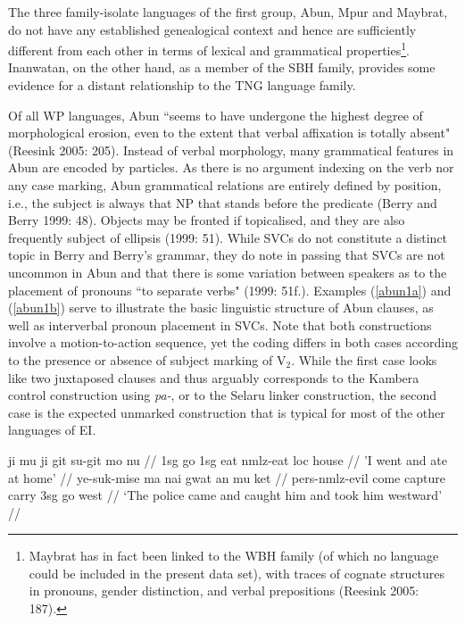 The three family-isolate languages of the first group, Abun, Mpur and Maybrat, do not have any established genealogical context and hence are sufficiently different from each other in terms of lexical and grammatical properties\footnote{Maybrat has in fact been linked to the \acs{WBH} family (of which no language could be included in the present data set), with traces of cognate structures in pronouns, gender distinction, and verbal prepositions (Reesink 2005: 187).}. Inanwatan, on the other hand, as a member of the SBH family, provides some evidence for a distant relationship to the TNG language family. 

Of all WP languages, Abun ``seems to have undergone the highest degree of morphological erosion, even to the extent that verbal affixation is totally absent" (Reesink 2005: 205). Instead of verbal morphology, many grammatical features in Abun are encoded by particles. As there is no argument indexing on the verb nor any case marking, Abun grammatical relations are entirely defined by position, i.e., the subject is always that NP that stands before the predicate (Berry and Berry 1999: 48). Objects may be fronted if topicalised, and they are also frequently subject of ellipsis (1999: 51). While SVCs do not constitute a distinct topic in Berry and Berry's grammar, they do note in passing that SVCs are not uncommon in Abun and that there is some variation between speakers as to the placement of pronouns ``to separate verbs" (1999: 51f.). Examples (\ref{abun1a}) and (\ref{abun1b}) serve to illustrate the basic linguistic structure of Abun clauses, as well as interverbal pronoun placement in SVCs. Note that both constructions involve a motion-to-action sequence, yet the coding differs in both cases according to the presence or absence of subject marking of V$_2$. While the first case looks like two juxtaposed clauses and thus arguably corresponds to the Kambera control construction using \textit{pa-}, or to the Selaru linker construction, the second case is the expected unmarked construction that is typical for most of the other languages of EI.

\pex 
\a \label{abun1a}
\begingl
\gla ji mu ji git su-git mo nu // 
\glb \acs{1}\acs{sg} go \acs{1}\acs{sg} eat \acs{nmlz}-eat \acs{loc} house //
\glft 'I went and ate at home' // 
\endgl
\a \label{abun1b}
\begingl
\gla ye-suk-mise ma nai gwat an mu ket // 
\glb \acs{pers}-\acs{nmlz}-evil come capture carry \acs{3}\acs{sg} go west //
\glft `The police came and caught him and took him westward' // 
\endgl
\xe

